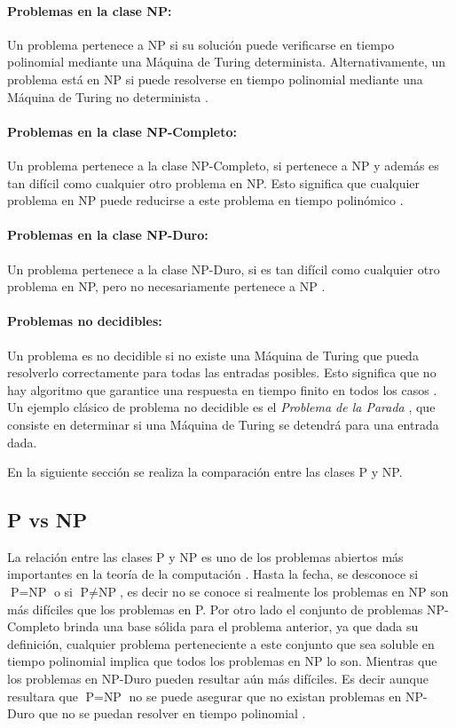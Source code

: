 \paragraph{Problemas en la clase NP:}
Un problema pertenece a NP si su solución puede verificarse en tiempo polinomial mediante una Máquina de Turing determinista. Alternativamente, un problema está en NP si puede resolverse en tiempo polinomial mediante una Máquina de Turing no determinista \cite{authomataTheory}.

\paragraph{Problemas en la clase NP-Completo:}
Un problema pertenece a la clase NP-Completo, si pertenece a NP y además es tan difícil como cualquier otro problema en NP. Esto significa que cualquier problema en NP puede reducirse a este problema en tiempo polinómico \cite{authomataTheory}.

\paragraph{Problemas en la clase NP-Duro:}
Un problema pertenece a la clase NP-Duro, si es tan difícil como cualquier otro problema en NP, pero no
necesariamente pertenece a NP \cite{authomataTheory}.

\paragraph{Problemas no decidibles:}
Un problema es no decidible si no existe una Máquina de Turing que pueda resolverlo correctamente para todas las entradas posibles. Esto significa que no hay algoritmo que garantice una respuesta en tiempo finito en todos los casos \cite{authomataTheory}. Un ejemplo clásico de problema no decidible es el \textit{Problema de la Parada} \cite{authomataTheory}, que consiste en determinar si una Máquina de Turing se detendrá para una entrada dada. 

En la siguiente sección se realiza la comparación entre las clases P y NP.

\subsection{P vs NP}

La relación entre las clases P y NP es uno de los problemas abiertos más importantes en la teoría de la
computación \cite{authomataTheory}. Hasta la fecha, se desconoce si $\text{P} = \text{NP}$ o si $\text{P} \neq \text{NP}$,
es decir no se conoce si realmente los problemas en NP son más difíciles que los problemas en P. Por otro
lado el conjunto de problemas NP-Completo brinda una base sólida para el problema anterior, ya que dada su
definición, cualquier problema perteneciente a este conjunto que sea soluble en tiempo polinomial
implica que todos los problemas en NP lo son. Mientras que los problemas en NP-Duro pueden resultar aún más
difíciles. Es decir aunque resultara que $\text{P} = \text{NP}$ no se puede asegurar que no existan problemas
en NP-Duro que no se puedan resolver en tiempo polinomial \cite{authomataTheory}.

